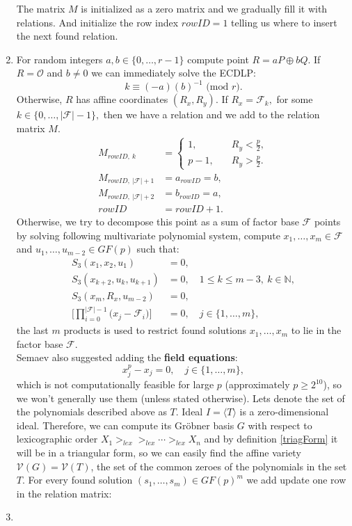 \documentclass[thesis=M,english]{FITthesis}[2012/10/20]
\theoremstyle{remark}
\theoremstyle{definition}
\begin{document}
\begin{enumerate}
The matrix $M$ is initialized as a zero matrix and we gradually fill it with relations. And initialize the row index $rowID = 1$ telling us where to insert the next found relation.
\item For random integers $a,b \in \{0, \ldots, r-1\}$ compute point ${R = aP \oplus bQ.}$ If $R = \mathcal{O}$ and $b \neq 0$ we can immediately solve the ECDLP:
$$k \equiv  (-a)(b)^{-1} \text{ (mod $r$)}.$$ Otherwise, $R$ has affine coordinates $(R_x, R_y)$. If $R_x = \mathcal{F}_k,$ for some $k \in \{0,\ldots,|\mathcal{F}| - 1\},$ then we have a relation and we add to the relation matrix $M$.
\begin{align*}
M_{rowID,\ k} &=\begin{cases} 1, \quad &R_y < \frac{p}{2}, \\
p-1, \quad &R_y > \frac{p}{2}.
\end{cases}\\
M_{rowID,\ |\mathcal{F}| + 1} &= a_{rowID} = b, \\
M_{rowID,\ |\mathcal{F}| + 2} &= b_{rowID} = a, \\
rowID &= rowID + 1.
\end{align*}
Otherwise, we try to decompose this point as a sum of factor base $\mathcal{F}$ points by solving following multivariate polynomial system, compute $x_1,\ldots,x_m \in \mathcal{F}$ and $u_1,\ldots,u_{m-2} \in GF(p)$ such that:
\begin{align*}
S_3(x_1,x_2,u_1) &= 0, \\
S_3(x_{k+2},u_k,u_{k+1}) &= 0,\quad 1 \leq k \leq m - 3,\ k \in \mathbb{N}, \\
S_3(x_m,R_x,u_{m-2}) &= 0, \\
\Bigg[\prod_{i=0}^{|\mathcal{F}| -1}\Big(x_j - \mathcal{F}_i\Big)\Bigg] &= 0, \quad  j \in \{1, \ldots, m\},
\end{align*}
the last $m$ products is used to restrict found solutions $x_1,\ldots,x_m$ to lie in the factor base $\mathcal{F}$. \\ 
\noindent Semaev also suggested adding the \textbf{field equations}:
$$
x_j^p - x_j = 0, \quad j \in \{1, \ldots, m\},
$$
which is not computationally feasible for large $p$ (approximately $p \geq 2^{10}$), so we won't generally use them (unless stated otherwise). Lets denote the set of the polynomials described above as $T$. Ideal $I = \langle T \rangle$ is a zero-dimensional ideal. Therefore, we can compute its Gröbner basis $G$ with respect to lexicographic order $X_1 >_{lex} >_{lex} \cdots >_{lex} X_n$ and by definition \ref{triagForm} it will be in a triangular form, so we can easily find the affine variety $\mathcal{V}(G) = \mathcal{V}(T)$, the set of the common zeroes of the polynomials in the set $T$. For every found solution ${(s_1, \ldots, s_m) \in GF(p)^m}$ we add update one row in the relation matrix:
$$
$$
\item 
\end{enumerate}
\end{document}
